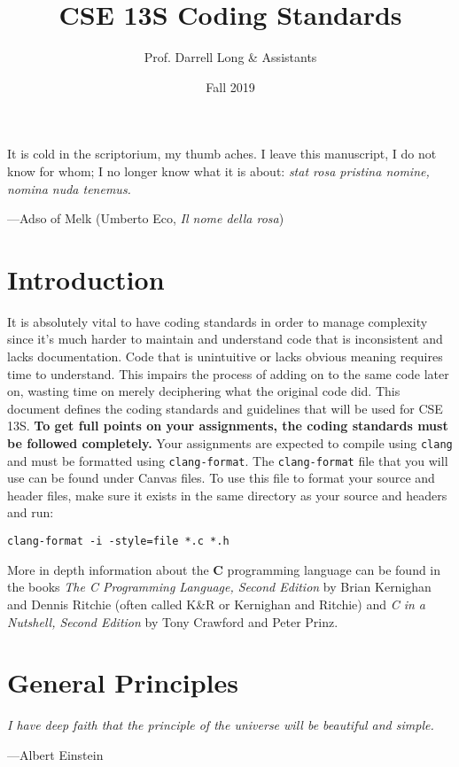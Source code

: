 \documentclass[11pt]{article}
\title{CSE 13S Coding Standards}
\author{Prof. Darrell Long \& Assistants}
\date{Fall 2019}
\begin{document}
\maketitle

\textwidth
\epigraph{It is cold in the scriptorium, my thumb aches. I leave
this manuscript, I do not know for whom; I no longer know what it
is about: \emph{stat rosa pristina nomine, nomina nuda tenemus.}}{---Adso of
Melk (Umberto Eco, \emph{Il nome della rosa})}

\section{Introduction}

It is absolutely vital to have coding standards in order to manage complexity
since it's much harder to maintain and understand code that is inconsistent and
lacks documentation. Code that is unintuitive or lacks obvious meaning requires
time to understand. This impairs the process of adding on to the same code
later on, wasting time on merely deciphering what the original code did.
This document defines the coding standards and guidelines that
will be used for CSE\,13S. \textbf{To get full points on your assignments, the
coding standards must be followed completely.} Your assignments are expected to
compile using \texttt{clang} and must be formatted using \texttt{clang-format}.
The \texttt{clang-format} file that you will use can be found under Canvas
files. To use this file to format your source and header files, make sure it
exists in the same directory as your source and headers and run:
\begin{lstlisting}
clang-format -i -style=file *.c *.h\end{lstlisting}

More in depth information about the \textbf{C} programming language can be found
in the books \emph{The C Programming Language, Second Edition} by Brian Kernighan
and Dennis Ritchie (often called K\&R or Kernighan and Ritchie) and \emph{C in a Nutshell, Second Edition} by Tony Crawford and Peter Prinz.

\section{General Principles}

\textwidth
\epigraph{\emph{I have deep faith that the principle of the universe will be
beautiful and simple.}}{---Albert Einstein}\noindent
\end{document}
